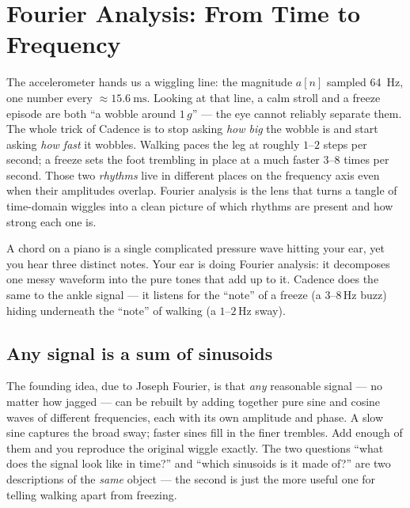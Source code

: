 \section{Fourier Analysis: From Time to Frequency}
\label{sec:fourier}

The accelerometer hands us a wiggling line: the magnitude \(a[n]\) sampled
\SI{64}{\hertz}, one number every \(\approx\SI{15.6}{\milli\second}\). Looking at
that line, a calm stroll and a freeze episode are both ``a wobble around \(1\,g\)''
--- the eye cannot reliably separate them. The whole trick of Cadence is to stop
asking \emph{how big} the wobble is and start asking \emph{how fast} it wobbles.
Walking paces the leg at roughly \(1\text{--}2\) steps per second; a freeze sets the
foot trembling in place at a much faster \(3\text{--}8\) times per second. Those two
\emph{rhythms} live in different places on the frequency axis even when their
amplitudes overlap. Fourier analysis is the lens that turns a tangle of time-domain
wiggles into a clean picture of which rhythms are present and how strong each one is.

\begin{intuition}
A chord on a piano is a single complicated pressure wave hitting your ear, yet you
hear three distinct notes. Your ear is doing Fourier analysis: it decomposes one
messy waveform into the pure tones that add up to it. Cadence does the same to the
ankle signal --- it listens for the ``note'' of a freeze (a \(3\text{--}8\,\)Hz
buzz) hiding underneath the ``note'' of walking (a \(1\text{--}2\,\)Hz sway).
\end{intuition}

\subsection{Any signal is a sum of sinusoids}

The founding idea, due to Joseph Fourier, is that \emph{any} reasonable signal --- no
matter how jagged --- can be rebuilt by adding together pure sine and cosine waves of
different frequencies, each with its own amplitude and phase. A slow sine captures the
broad sway; faster sines fill in the finer trembles. Add enough of them and you
reproduce the original wiggle exactly. The two questions ``what does the signal look
like in time?'' and ``which sinusoids is it made of?'' are two descriptions of the
\emph{same} object --- the second is just the more useful one for telling walking
apart from freezing.


